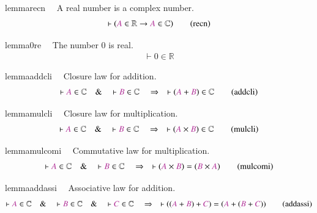 \begin{restatable}{lemma}{recn}~~ A real number is a complex number. 
~
\begin{align}
\vdash ( \mc{A} \in \mathbb{R} \rightarrow \mc{A} \in \mathbb{C}
    )\label{eq:recn}\tag{recn}
\end{align}
\end{restatable}

\begin{restatable}{lemma}{0re}~~ The number 0 is real.   ~
\begin{align}
\vdash 0 \in \mathbb{R}\label{eq:0re}\tag{0re}
\end{align}
\end{restatable}

\begin{restatable}{lemma}{addcli}~~ Closure law for addition.  ~
\begin{align}
\vdash \mc{A} \in \mathbb{C}\quad\&\quad \vdash \mc{B} \in
    \mathbb{C}\quad\Rightarrow\quad \vdash ( \mc{A} + \mc{B} ) \in
    \mathbb{C}\label{eq:addcli}\tag{addcli}
\end{align}
\end{restatable}

\begin{restatable}{lemma}{mulcli}~~ Closure law for multiplication. 
~
\begin{align}
\vdash \mc{A} \in \mathbb{C}\quad\&\quad \vdash \mc{B} \in
    \mathbb{C}\quad\Rightarrow\quad \vdash ( \mc{A} \times \mc{B} ) \in
    \mathbb{C}\label{eq:mulcli}\tag{mulcli}
\end{align}
\end{restatable}

\begin{restatable}{lemma}{mulcomi}~~ Commutative law for multiplication. 
~
\begin{align}
\vdash \mc{A} \in \mathbb{C}\quad\&\quad \vdash \mc{B} \in
    \mathbb{C}\quad\Rightarrow\quad \vdash ( \mc{A} \times \mc{B} ) = ( \mc{B}
    \times \mc{A} )\label{eq:mulcomi}\tag{mulcomi}
\end{align}
\end{restatable}

\begin{restatable}{lemma}{addassi}~~ Associative law for addition. 
\begin{align}
\vdash \mc{A} \in \mathbb{C}\quad\&\quad \vdash \mc{B} \in
    \mathbb{C}\quad\&\quad \vdash \mc{C} \in \mathbb{C}\quad\Rightarrow\quad
    \vdash ( ( \mc{A} + \mc{B} ) + \mc{C} ) = ( \mc{A} + ( \mc{B} + \mc{C} )
    )\label{eq:addassi}\tag{addassi}
\end{align}
\end{restatable}

